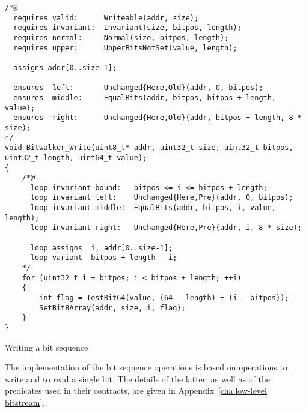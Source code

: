\begin{listing}[hbt]
\begin{minipage}{0.99\textwidth}
\begin{lstlisting}[style=acsl-block]
/*@
  requires valid:      Writeable(addr, size);
  requires invariant:  Invariant(size, bitpos, length);
  requires normal:     Normal(size, bitpos, length);
  requires upper:      UpperBitsNotSet(value, length);

  assigns addr[0..size-1];

  ensures  left:       Unchanged{Here,Old}(addr, 0, bitpos);
  ensures  middle:     EqualBits(addr, bitpos, bitpos + length, value);
  ensures  right:      Unchanged{Here,Old}(addr, bitpos + length, 8 * size);
*/
void Bitwalker_Write(uint8_t* addr, uint32_t size, uint32_t bitpos, uint32_t length, uint64_t value);
{
    /*@
      loop invariant bound:   bitpos <= i <= bitpos + length;
      loop invariant left:    Unchanged{Here,Pre}(addr, 0, bitpos);
      loop invariant middle:  EqualBits(addr, bitpos, i, value, length);
      loop invariant right:   Unchanged{Here,Pre}(addr, i, 8 * size);

      loop assigns  i, addr[0..size-1];
      loop variant  bitpos + length - i;
    */
    for (uint32_t i = bitpos; i < bitpos + length; ++i)
    {
        int flag = TestBit64(value, (64 - length) + (i - bitpos));
        SetBit8Array(addr, size, i, flag);
    }   
}

\end{lstlisting}
\end{minipage}
\caption{\label{Bitwalker_Write spec}Writing a bit sequence}
\end{listing}





The implementation of the bit sequence operations is based
on operations to write and to read a single bit.
%
The details of the latter, as well as of the predicates used in their contracts,
are given in Appendix~\ref{cha:low-level bitstream}.















